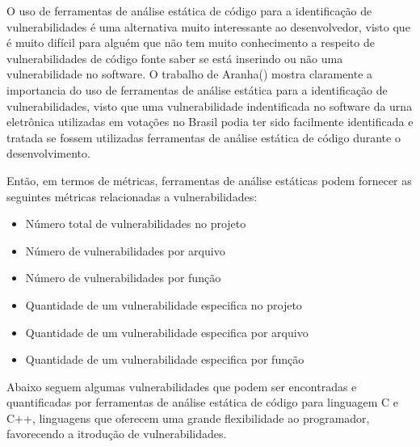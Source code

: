 O uso de ferramentas de análise estática de código para a identificação de vulnerabilidades é uma alternativa muito interessante ao desenvolvedor, visto que é muito difícil para alguém que não tem muito conhecimento a respeito de vulnerabilidades de código fonte saber se está inserindo ou não uma vulnerabilidade no software. O trabalho de Aranha(\citeyear{aranha2012}) mostra claramente a importancia do uso de ferramentas de análise estática para a identificação de vulnerabilidades, visto que uma vulnerabilidade indentificada no software da urna eletrônica utilizadas em votações no Brasil podia ter sido facilmente identificada e tratada se fossem utilizadas ferramentas de análise estática de código durante o desenvolvimento.

%

Então, em termos de métricas, ferramentas de análise estáticas podem fornecer as seguintes métricas relacionadas a vulnerabilidades:

\begin{itemize}
\item Número total de vulnerabilidades no projeto
\item Número de vulnerabilidades por arquivo
\item Número de vulnerabilidades por função
\item Quantidade de um vulnerabilidade especifica no projeto
\item Quantidade de um vulnerabilidade especifica por arquivo
\item Quantidade de um vulnerabilidade especifica por função
\end{itemize}

%
Abaixo seguem algumas vulnerabilidades que podem ser encontradas e quantificadas	 por ferramentas de análise estática de código para linguagem C e C++, linguagens que oferecem uma grande flexibilidade ao programador, favorecendo a itrodução de vulnerabilidades.

